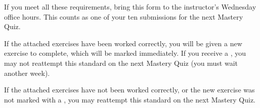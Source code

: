 \documentclass[12pt]{article}
\begin{document}
If you meet all these requirements,
bring this form to the instructor's Wednesday office hours. This counts
as one of your ten submissions for the next Mastery Quiz.

\vspace{1em}

If the attached exercises have been worked correctly, you will be given
a new exercise to complete, which will be marked immediately. If you
receive a \checkmark{}, you may not reattempt this standard on the next
Mastery Quiz (you must wait another week).

\vspace{1em}

If the attached exercises have not been worked correctly, or the
new exercise was not marked with a \checkmark{}, you may reattempt
this standard on the next Mastery Quiz.
\end{document}
